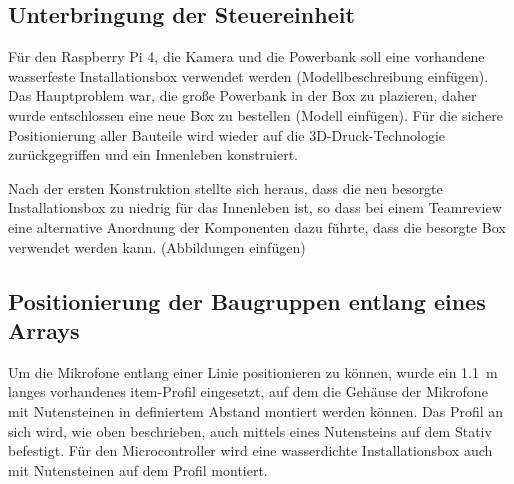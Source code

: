 \subsection{Unterbringung der Steuereinheit}

Für den Raspberry Pi 4, die Kamera und die Powerbank soll eine vorhandene wasserfeste Installationsbox verwendet werden (Modellbeschreibung einfügen). Das Hauptproblem war, die große Powerbank in der Box zu plazieren, daher wurde entschlossen eine neue Box zu bestellen (Modell einfügen). Für die sichere Positionierung aller Bauteile wird wieder auf die 3D-Druck-Technologie zurückgegriffen und ein Innenleben konstruiert.

Nach der ersten Konstruktion stellte sich heraus, dass die neu besorgte Installationsbox zu niedrig für das Innenleben ist, so dass bei einem Teamreview eine alternative Anordnung der Komponenten dazu führte, dass die besorgte Box verwendet werden kann. (Abbildungen einfügen)

\subsection{Positionierung der Baugruppen entlang eines Arrays}

Um die Mikrofone entlang einer Linie positionieren zu können, wurde ein \SI{1,1}{m} langes vorhandenes item-Profil eingesetzt, auf dem die Gehäuse der Mikrofone mit Nutensteinen in definiertem Abstand montiert werden können. Das Profil an sich wird, wie oben beschrieben, auch mittels eines Nutensteins auf dem Stativ befestigt. Für den Microcontroller wird eine wasserdichte Installationsbox auch mit Nutensteinen auf dem Profil montiert.